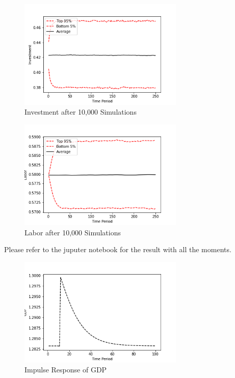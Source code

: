 \documentclass[letterpaper,11pt]{article}
\theoremstyle{definition}
\begin{document}
\begin{spacing}{1.5}
\begin{Exercise}
		\begin{figure}[H]
			\caption{Investment after 10,000 Simulations}
			\label{fig:investment_10000}
			\includegraphics[width=0.7\textwidth]{investment.png}
		\end{figure}

		\begin{figure}[H]
			\caption{Labor after 10,000 Simulations}
			\label{fig:labor_10000}
			\includegraphics[width=0.7\textwidth]{labor.png}
		\end{figure}
	\end{Exercise}

	\begin{Exercise} \label{Linear_HW_Base_Moments}
			Please refer to the juputer notebook for the result with all the moments.
	\end{Exercise}

	\begin{Exercise} \label{Linear_HW_Base_IRFs}
		\begin{figure}[H]
			\caption{Impulse Response of GDP}
			\label{fig:GDP_impulse}
			\includegraphics[width=0.7\textwidth]{GDPimpulse.png}
		\end{figure}


\end{Exercise}
\end{spacing}
\end{document}
